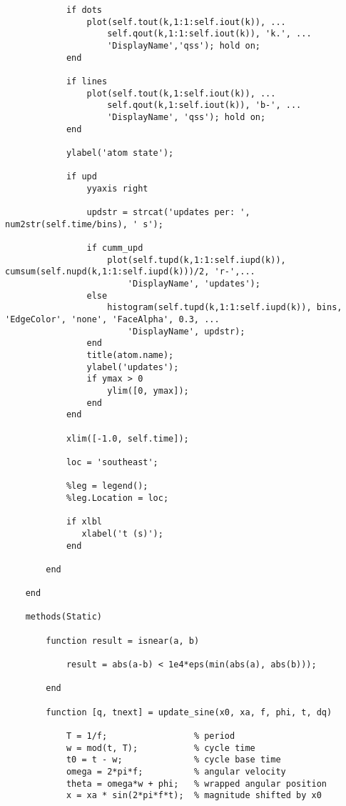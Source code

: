 \begin{lstlisting}
            if dots
                plot(self.tout(k,1:1:self.iout(k)), ...
                    self.qout(k,1:1:self.iout(k)), 'k.', ...
                    'DisplayName','qss'); hold on;
            end
            
            if lines
                plot(self.tout(k,1:self.iout(k)), ...
                    self.qout(k,1:self.iout(k)), 'b-', ...
                    'DisplayName', 'qss'); hold on;
            end

            ylabel('atom state');
            
            if upd
                yyaxis right
                
                updstr = strcat('updates per: ', num2str(self.time/bins), ' s');
                
                if cumm_upd
                    plot(self.tupd(k,1:1:self.iupd(k)), cumsum(self.nupd(k,1:1:self.iupd(k)))/2, 'r-',...
                        'DisplayName', 'updates');
                else
                    histogram(self.tupd(k,1:1:self.iupd(k)), bins, 'EdgeColor', 'none', 'FaceAlpha', 0.3, ...
                        'DisplayName', updstr);
                end
                title(atom.name);
                ylabel('updates');
                if ymax > 0
                    ylim([0, ymax]);
                end
            end
            
            xlim([-1.0, self.time]);
            
            loc = 'southeast';

            %leg = legend();
            %leg.Location = loc;
            
            if xlbl
               xlabel('t (s)');
            end
            
        end
         
    end
    
    methods(Static)
        
        function result = isnear(a, b)
            
            result = abs(a-b) < 1e4*eps(min(abs(a), abs(b)));
            
        end
        
        function [q, tnext] = update_sine(x0, xa, f, phi, t, dq)

            T = 1/f;                 % period
            w = mod(t, T);           % cycle time
            t0 = t - w;              % cycle base time
            omega = 2*pi*f;          % angular velocity
            theta = omega*w + phi;   % wrapped angular position
            x = xa * sin(2*pi*f*t);  % magnitude shifted by x0


\end{lstlisting}
